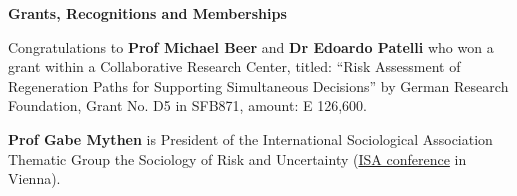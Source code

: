 \documentclass[11pt]{article}%
\begin{document}
\cleardoublepage

\thispagestyle{Grants}

\begin{minipage}[t]{0.99\textwidth}
\vspace{5pt}
\hypertarget{Grants}{\Large{\bf Grants, Recognitions and Memberships}}
\end{minipage}


\begin{minipage}[t]{0.99\textwidth}
Congratulations to {\bf Prof Michael Beer} and {\bf Dr Edoardo Patelli} who won a grant within a Collaborative Research Center, titled: ``Risk Assessment of Regeneration Paths for Supporting Simultaneous Decisions'' by German Research Foundation, Grant No. D5 in SFB871, amount: E 126,600.

\vspace{10pt}

{\bf Prof Gabe Mythen} is President of the International Sociological Association Thematic Group the Sociology of Risk and Uncertainty
    (\href{http://www.isa-sociology.org/forum-2016/}{ISA conference} in Vienna).
    
\vspace{5pt}


\end{minipage}
\end{document}
